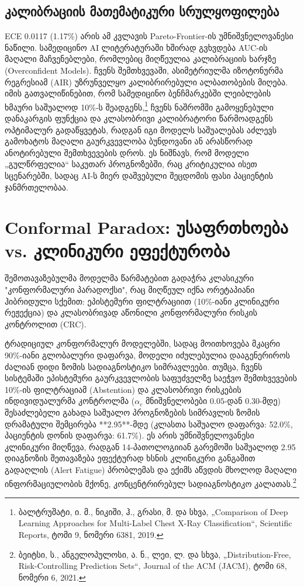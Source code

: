 \documentclass[12pt,a4paper,oneside]{report}
\begin{document}
\subsection{კალიბრაციის მათემატიკური სრულყოფილება}
ECE 0.0117 (1.17\%) არის ამ კვლავის Pareto-Frontier-ის უმნიშვნელოვანესი ნაწილი. სამედიცინო AI ლიტერატურაში ხშირად გვხვდება AUC-ის მაღალი მაჩვენებლები, რომლებიც მიღწეულია კალიბრაციის ხარჯზე (Overconfident Models). ჩვენს შემთხვევაში, ასიმეტრიულმა იზოტონურმა რეგრესიამ (AIR) უზრუნველყო კალიბრირებული ალბათობების მიღება. იმის გათვალიწინებით, რომ სამედიცინო ბენჩმარკებში ლეიბლების ხმაური საშუალოდ 10\%-ს შეადგენს,\footnote{ბალტრუშატი, ი. მ., ნიკიში, ჰ., გრასი, მ. და სხვა, „Comparison of Deep Learning Approaches for Multi-Label Chest X-Ray Classification“, Scientific Reports, ტომი 9, ნომერი 6381, 2019.} ჩვენს ნაშრომში გამოყენებული დანაკარგის ფუნქცია და კლასობრივი კალიბრატორი წარმოადგენს ოპტიმალურ გადაწყვეტას, რადგან იგი მოდელს საშუალებას აძლევს გამოხატოს მაღალი გაურკვევლობა ბუნდოვანი ან არასწორად ანოტირებული შემთხვევების დროს. ეს ნიშნავს, რომ მოდელი „გულწრფელია“ საკუთარ პროგნოზებში, რაც კრიტიკულია ისეთ სცენარებში, სადაც AI-ს მიერ დაშვებული შეცდომის ფასი პაციენტის ჯანმრთელობაა.

\section{Conformal Paradox: უსაფრთხოება vs. კლინიკური ეფექტურობა}
შემოთავაზებულმა მოდელმა წარმატებით გადაჭრა კლასიკური "კონფორმალური პარადოქსი", რაც მიღწეულ იქნა ორეტაპიანი ჰიბრიდული სქემით: ეპისტემური ფილტრაციით (10\%-იანი კლინიკური რეჟექცია) და კლასობრივად აწონილი კონფორმალური რისკის კონტროლით (CRC). 

ტრადიციულ კონფორმალურ მოდელებში, სადაც მოითხოვება მკაცრი 90\%-იანი გლობალური დაფარვა, მოდელი იძულებულია დააგენერიროს ძალიან დიდი ზომის სადიაგნოსტიკო სიმრავლეები. თუმცა, ჩვენს სისტემაში ეპისტემური გაურკვევლობის საფუძველზე საეჭვო შემთხვევების 10\%-ის ფილტრაციამ (Abstention) და კლასობრივი რისკების ინდივიდუალურმა კონტროლმა ($\alpha_c$ მნიშვნელობები $0.05$-დან $0.30$-მდე) შესაძლებელი გახადა საშუალო პროგნოზების სიმრავლის ზომის დრამატული შემცირება **2.95**-მდე (კლასთა საშუალო დაფარვა: 52.0\%, პაციენტის დონის დაფარვა: 61.7\%). ეს არის უმნიშვნელოვანესი კლინიკური მიღწევა, რადგან 14-პათოლოგიიან გარემოში საშუალოდ 2.95 დიაგნოზის შეთავაზება ეფექტურად ხსნის კლინიკური განგაშით გადაღლის (Alert Fatigue) პრობლემას და ექიმს აწვდის მხოლოდ მაღალი ინფორმაციულობის მქონე, კონცენტრირებულ სადიაგნოსტიკო კალათას.\footnote{ბეიტსი, ს., ანგელოპულოსი, ა. ნ., ლეი, ლ. და სხვა, „Distribution-Free, Risk-Controlling Prediction Sets“, Journal of the ACM (JACM), ტომი 68, ნომერი 6, 2021.}
\end{document}

